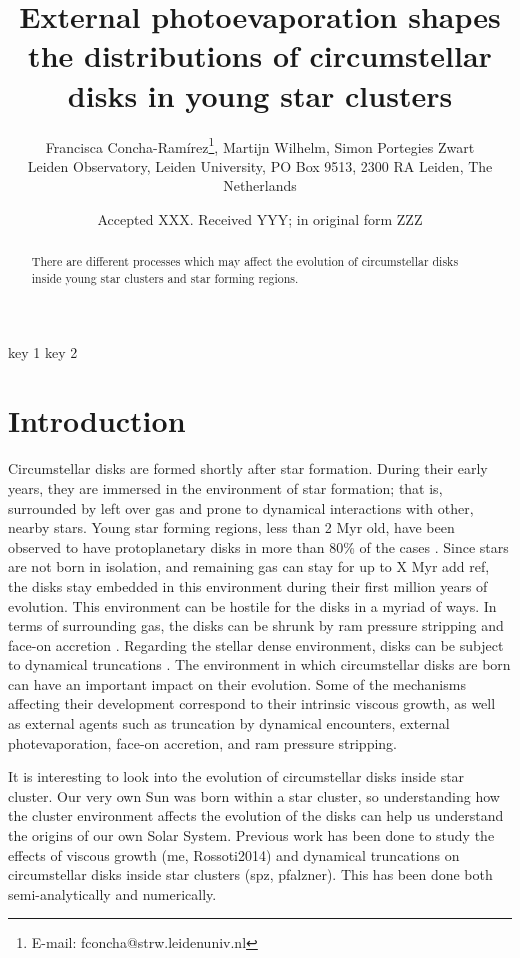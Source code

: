 \documentclass[fleqn,usenatbib]{mnras}
\title[External photoevaporation of disks in young star clusters]{External photoevaporation shapes the distributions of circumstellar disks in young star clusters}
\author[Concha-Ramírez et al.]{
Francisca Concha-Ramírez\thanks{E-mail: fconcha@strw.leidenuniv.nl},
Martijn Wilhelm,
Simon Portegies Zwart
\\
Leiden Observatory, Leiden University, PO Box 9513, 2300 RA Leiden, The Netherlands\\
}
\date{Accepted XXX. Received YYY; in original form ZZZ}
\newcommand\note[1]{{\colorbox{yellow!60}{\color{magenta}#1}}}
\begin{document}
\label{firstpage}
\pagerange{\pageref{firstpage}--\pageref{lastpage}}
\maketitle

\begin{abstract}
There are different processes which may affect the evolution of circumstellar disks inside young star clusters and star forming regions.
\end{abstract}

\begin{keywords}
key 1 key 2
\end{keywords}

\section{Introduction}
\label{sec:introduction}

Circumstellar disks are formed shortly after star formation. During their early years, they are immersed in the environment of star formation; that is, surrounded by left over gas and prone to dynamical interactions with other, nearby stars. Young star forming regions, less than 2 Myr old, have been observed to have protoplanetary disks in more than 80\% of the cases \citep{fedele_timescale_2010}. Since stars are not born in isolation, and remaining gas can stay for up to X Myr \note{add ref}, the disks stay embedded in this environment during their first million years of evolution. This environment can be hostile for the disks in a myriad of ways. In terms of surrounding gas, the disks can be shrunk by ram pressure stripping and face-on accretion \citep{wijnen_face-accretion_2016, wijnen_protoplanetary_2017}. Regarding the stellar dense environment, disks can be subject to dynamical truncations \citep{portegieszwart2016, vincke2015, vincke2016}.
The environment in which circumstellar disks are born can have an important impact on their evolution. Some of the mechanisms affecting their development correspond to their intrinsic viscous growth, as well as external agents such as truncation by dynamical encounters, external photevaporation, face-on accretion, and ram pressure stripping. 

It is interesting to look into the evolution of circumstellar disks inside star cluster. Our very own Sun was born within a star cluster, so understanding how the cluster environment affects the evolution of the disks can help us understand the origins of our own Solar System. Previous work has been done to study the effects of viscous growth (me, Rossoti2014) and dynamical truncations on circumstellar disks inside star clusters (spz, pfalzner). This has been done both semi-analytically and numerically. 
\end{document}
